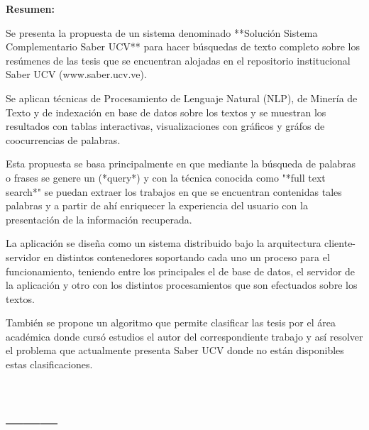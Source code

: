 \documentclass[
  10,
  openany]{book}
\begin{document}
\setlength{\abovedisplayskip}{-5pt}
\setlength{\abovedisplayshortskip}{-5pt}
\thispagestyle{empty}

\thispagestyle{empty}

\newpage
\thispagestyle{empty}
\large{\textbf{Resumen:}}

Se presenta la propuesta de un sistema denominado **Solución Sistema Complementario Saber UCV**  para hacer búsquedas de texto completo sobre los resúmenes de las tesis que se encuentran alojadas en el repositorio institucional Saber UCV (www.saber.ucv.ve). 

Se aplican técnicas de Procesamiento de Lenguaje Natural (NLP), de Minería de Texto y de indexación en base de datos sobre los textos y se muestran los resultados con tablas interactivas, visualizaciones con gráficos y gráfos de coocurrencias de palabras.

Esta propuesta se basa principalmente en que mediante la búsqueda de palabras o frases se genere un (*query*) y con la técnica conocida como "*full text search*" se puedan extraer los trabajos en que se encuentran contenidas tales palabras y a partir de ahí enriquecer la experiencia del usuario con la presentación de la información recuperada.

La aplicación se diseña como un sistema distribuido bajo la arquitectura cliente-servidor en distintos contenedores soportando cada uno un proceso para el funcionamiento, teniendo entre los principales el de base de datos, el servidor de la aplicación y otro con los distintos procesamientos que son efectuados sobre los textos.

También se propone un algoritmo que permite clasificar las tesis por el área académica donde cursó estudios el autor del correspondiente trabajo y así resolver el problema  que actualmente presenta  Saber UCV donde no están disponibles estas clasificaciones.


\thispagestyle{empty}

\maketitle



{
\setcounter{tocdepth}{3}
\tableofcontents
}
\listoffigures
\listoftables
\clearpage
{}

\hypertarget{section}{%
\chapter*{\_\_\_}\label{section}}
\end{document}
